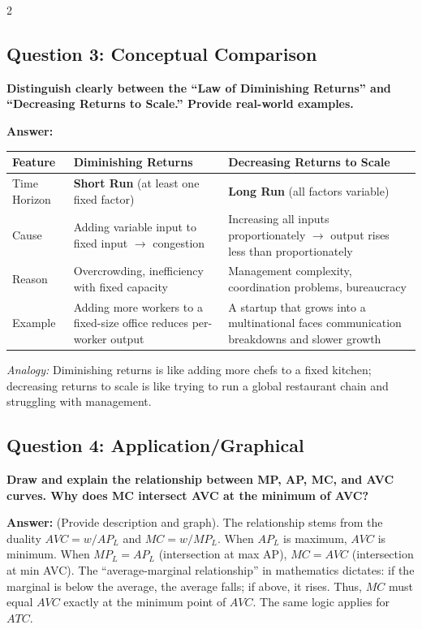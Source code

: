 \documentclass[10pt,a4paper]{article}
\begin{document}
\begin{multicols}{2}
\vspace{0.2cm}

\subsection*{Question 3: Conceptual Comparison}
\textbf{Distinguish clearly between the ``Law of Diminishing Returns'' and ``Decreasing Returns to Scale.'' Provide real-world examples.}

\vspace{0.05cm}
\textbf{Answer:}
\begin{center}
\begin{tabular}{@{}p{2.8cm}p{3cm}p{3cm}@{}}
\toprule
\textbf{Feature} & \textbf{Diminishing Returns} & \textbf{Decreasing Returns to Scale} \\
\midrule
Time Horizon & \textbf{Short Run} (at least one fixed factor) & \textbf{Long Run} (all factors variable) \\
Cause & Adding variable input to fixed input $\to$ congestion & Increasing all inputs proportionately $\to$ output rises less than proportionately \\
Reason & Overcrowding, inefficiency with fixed capacity & Management complexity, coordination problems, bureaucracy \\
Example & Adding more workers to a fixed-size office reduces per-worker output & A startup that grows into a multinational faces communication breakdowns and slower growth \\
\bottomrule
\end{tabular}
\end{center}
\textit{Analogy:} Diminishing returns is like adding more chefs to a fixed kitchen; decreasing returns to scale is like trying to run a global restaurant chain and struggling with management.

\vspace{0.2cm}

\subsection*{Question 4: Application/Graphical}
\textbf{Draw and explain the relationship between MP, AP, MC, and AVC curves. Why does MC intersect AVC at the minimum of AVC?}

\vspace{0.05cm}
\textbf{Answer:} (Provide description and graph). The relationship stems from the duality $AVC = w/AP_L$ and $MC = w/MP_L$. When $AP_L$ is maximum, $AVC$ is minimum. When $MP_L = AP_L$ (intersection at max AP), $MC = AVC$ (intersection at min AVC). The ``average-marginal relationship'' in mathematics dictates: if the marginal is below the average, the average falls; if above, it rises. Thus, $MC$ must equal $AVC$ exactly at the minimum point of $AVC$. The same logic applies for $ATC$.

\end{multicols}
\end{document}
